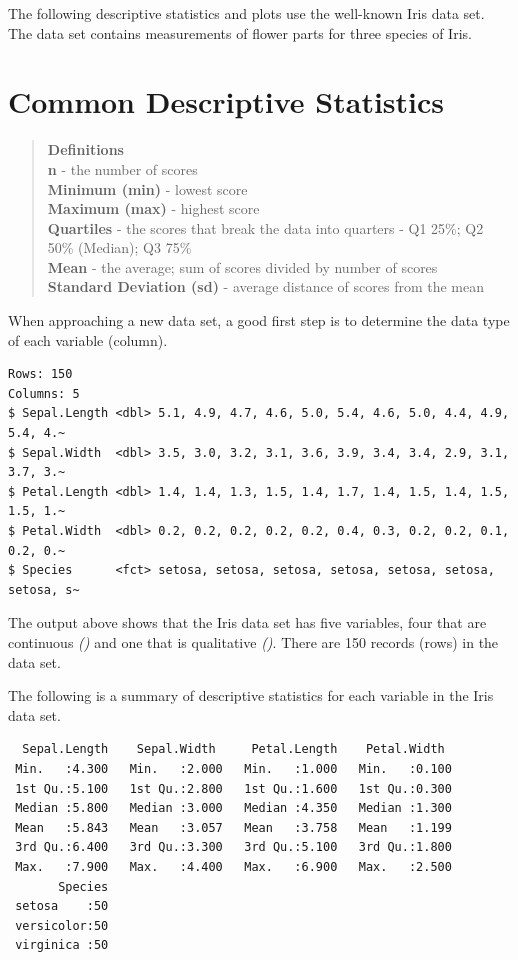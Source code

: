 \documentclass[
]{book}
\begin{document}
The following descriptive statistics and plots use the well-known Iris data set. The data set contains measurements of flower parts for three species of Iris.

\section{Common Descriptive Statistics}\label{common-descriptive-statistics}

\begin{quote}
\textbf{Definitions}\\
\textbf{n} - the number of scores\\
\textbf{Minimum (min)} - lowest score\\
\textbf{Maximum (max)} - highest score\\
\textbf{Quartiles} - the scores that break the data into quarters - Q1 25\%; Q2 50\% (Median); Q3 75\%\\
\textbf{Mean} - the average; sum of scores divided by number of scores\\
\textbf{Standard Deviation (sd)} - average distance of scores from the mean
\end{quote}

When approaching a new data set, a good first step is to determine the data type of each variable (column).

\begin{verbatim}
Rows: 150
Columns: 5
$ Sepal.Length <dbl> 5.1, 4.9, 4.7, 4.6, 5.0, 5.4, 4.6, 5.0, 4.4, 4.9, 5.4, 4.~
$ Sepal.Width  <dbl> 3.5, 3.0, 3.2, 3.1, 3.6, 3.9, 3.4, 3.4, 2.9, 3.1, 3.7, 3.~
$ Petal.Length <dbl> 1.4, 1.4, 1.3, 1.5, 1.4, 1.7, 1.4, 1.5, 1.4, 1.5, 1.5, 1.~
$ Petal.Width  <dbl> 0.2, 0.2, 0.2, 0.2, 0.2, 0.4, 0.3, 0.2, 0.2, 0.1, 0.2, 0.~
$ Species      <fct> setosa, setosa, setosa, setosa, setosa, setosa, setosa, s~
\end{verbatim}

The output above shows that the Iris data set has five variables, four that are continuous \emph{()} and one that is qualitative \emph{()}. There are 150 records (rows) in the data set.

The following is a summary of descriptive statistics for each variable in the Iris data set.

\begin{verbatim}
  Sepal.Length    Sepal.Width     Petal.Length    Petal.Width   
 Min.   :4.300   Min.   :2.000   Min.   :1.000   Min.   :0.100  
 1st Qu.:5.100   1st Qu.:2.800   1st Qu.:1.600   1st Qu.:0.300  
 Median :5.800   Median :3.000   Median :4.350   Median :1.300  
 Mean   :5.843   Mean   :3.057   Mean   :3.758   Mean   :1.199  
 3rd Qu.:6.400   3rd Qu.:3.300   3rd Qu.:5.100   3rd Qu.:1.800  
 Max.   :7.900   Max.   :4.400   Max.   :6.900   Max.   :2.500  
       Species  
 setosa    :50  
 versicolor:50  
 virginica :50  
                
                
                
\end{verbatim}
\end{document}
